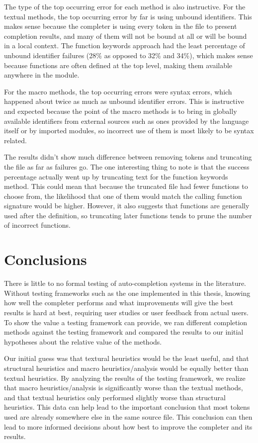\documentclass[ms,electronic,twosidetoc,letterpaper,chaptercenter,parttop,lol,lof,lot]{byumsphd}
\begin{document}
The type of the top occurring error for each method is also instructive.
For the textual methods, the top occurring error by far is using unbound identifiers.
This makes sense because the completer is using every token in the file to present completion results, and many of them will not be bound at all or will be bound in a local context.
The function keywords approach had the least percentage of unbound identifier failures (28\% as opposed to 32\% and 34\%), which makes sense because functions are often defined at the top level, making them available anywhere in the module.

For the macro methods, the top occurring errors were syntax errors, which happened about twice as much as unbound identifier errors.
This is instructive and expected because the point of the macro methods is to bring in globally available identifiers from external sources such as ones provided by the language itself or by imported modules, so incorrect use of them is most likely to be syntax related.

The results didn't show much difference between removing tokens and truncating the file as far as failures go.
The one interesting thing to note is that the success percentage actually went up by truncating text for the function keywords method.
This could mean that because the truncated file had fewer functions to choose from, the likelihood that one of them would match the calling function signature would be higher.
However, it also suggests that functions are generally used after the definition, so truncating later functions tends to prune the number of incorrect functions.

\chapter{Conclusions}

There is little to no formal testing of auto-completion systems in the literature.
Without testing frameworks such as the one implemented in this thesis, knowing how well the completer performs and what improvements will give the best results is hard at best, requiring user studies or user feedback from actual users.
To show the value a testing framework can provide, we ran different completion methods against the testing framework and compared the results to our initial hypotheses about the relative value of the methods.

Our initial guess was that textural heuristics would be the least useful, and that structural heuristics and macro heuristics/analysis would be equally better than textual heuristics.
By analyzing the results of the testing framework, we realize that macro heuristics/analysis is significantly worse than the textual methods, and that textual heuristics only performed slightly worse than structural heuristics.
This data can help lead to the important conclusion that most tokens used are already somewhere else in the same source file.
This conclusion can then lead to more informed decisions about how best to improve the completer and its results.
\end{document}
